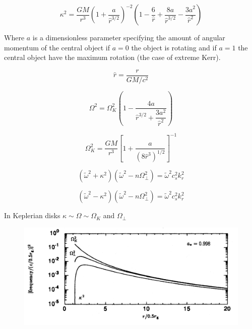 \begin{equation}
\kappa^2 = \dfrac{GM}{r^3}\left( 1 + \dfrac{a}{\hat{r}^{3/2}}
\right)^{-2} \left(1 - \dfrac{6}{\hat{r}} + \dfrac{8a}{\hat{r}^{3/2}}
- \dfrac{3a^2}{\hat{r}^2}  \right)
\end{equation}

Where $a$ is a dimensionless parameter specifying the amount of
angular momentum of the central object if $a=0$ the object is rotating
and if $a=1$ the central object have the maximum rotation (the case of
extreme Kerr).

\begin{equation}
\hat{r} = \dfrac{r}{GM/c^2}
\end{equation}

\begin{equation}
\Omega_{}^2 = \Omega_{K}^2 \left(1 - \dfrac{4a}{\hat{r}^{3/2} +
\dfrac{3a^2}{\hat{r}^2}} \right)
\end{equation}

\begin{equation}
\Omega_K^2 = \dfrac{GM}{r^3} \left[ 1 + \dfrac{a}{(8
\hat{r}^3)^{1/2}}\right]^{-1}
\end{equation}

\begin{equation}
(\tilde{\omega}^2 + \kappa^2)(\tilde{\omega}^2 - n \Omega_{\bot}^2) =
\tilde{\omega}^2 c_s^2 k_{r}^2
\end{equation}

\begin{equation}
(\tilde{\omega}^2 - \kappa^2)(\tilde{\omega}^2 - n\Omega_{\bot}^2 ) =
\tilde{\omega}^2 c_s^2 k_r^2
\end{equation}

In Keplerian disks $\kappa \sim \Omega \sim \Omega_K$ and
$\Omega_{\bot}$ 

\begin{figure}
\centering
\includegraphics[scale=0.3]{relativsitc.png}
\end{figure}

